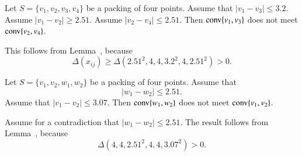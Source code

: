 \begin{tarskidata}
\begin{tarski}

\begin{lemma}
Let $S=\{v_1,v_2,v_3,v_4\}$ be a packing of four points.
  Assume that
	$|v_1-v_3|\le 3.2$.  Assume $|v_1-v_2|\ge 2.51$.
Assume $|v_2-v_4|\le 2.51$.
Then ${\operatorname{conv}}\{v_1,v_3\}$ does not meet
${\operatorname{conv}}\{v_2,v_4\}$.
\end{lemma}


\begin{proved}  This follows from Lemma~,
because    
   $$
    \Delta(x_{ij})\ge \Delta(2.51^2,4,4,3.2^2,4,2.51^2)>0.
    $$
\swallowed\end{proved}
\end{tarski}


    


\begin{tarski}

\begin{lemma}
Let $S=\{v_1,v_2,w_1,w_2\}$ be a packing of four points.
Assume that
	$$|w_1-w_2|\le 2.51.$$
Assume that $|v_1-v_2|\le 3.07$.  
Then
${\operatorname{conv}}\{w_1,w_2\}$ does not meet ${\operatorname{conv}}\{v_1,v_2\}$.
\end{lemma}


\begin{proved}
Assume for a contradiction that $|w_1-w_2|\le2.51$.
The result follows from  Lemma~,
because 
    $$
    \Delta(4,4,2.51^2,4,4,3.07^2) > 0.
    $$
\swallowed\end{proved}
\end{tarski}





\begin{tarski}


\end{tarski}
\end{tarskidata}
